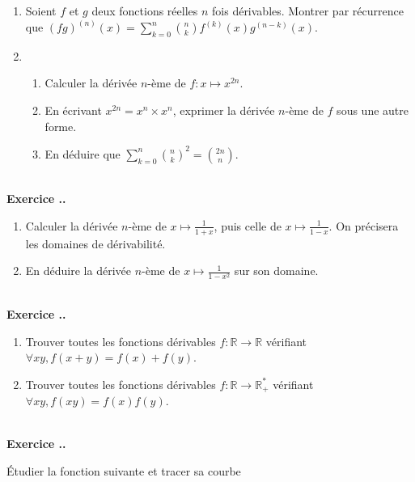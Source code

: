 \documentclass{article}
\newcommand{\mb}[1]{\mathbb{#1}}
\newcounter{exo}
\newcommand{\exercice}[1][\null]{\textbf{\\ Exercice \thesection.\theexo. #1} \addtocounter{exo}{1}}
\begin{document}
\begin{enumerate}

\item Soient $f$ et $g$ deux fonctions réelles $n$ fois dérivables. Montrer par récurrence que $\displaystyle (fg)^{(n)} (x)= \sum_{k=0}^n {n \choose k} f^{(k)}(x) g^{(n-k)}(x)$.

\item \begin{enumerate}

\item Calculer la dérivée $n$-ème de $f:x \mapsto x^{2n}$.

\item En écrivant $x^{2n} = x^n\times x^n$, exprimer la dérivée $n$-ème de $f$ sous une autre forme.

\item En déduire que $\displaystyle \sum_{k=0}^n {n \choose k}^2 = {2n \choose n}$.

\end{enumerate}

\end{enumerate}

\exercice 

\begin{enumerate}

\item Calculer la dérivée $n$-ème de $x \mapsto \frac{1}{1+x}$, puis celle de $x \mapsto \frac{1}{1-x}$. On précisera les domaines de dérivabilité.

\item En déduire la dérivée $n$-ème de $x \mapsto \frac{1}{1-x^2}$ sur son domaine.

\end{enumerate}





\exercice

\begin{enumerate}

\item Trouver toutes les fonctions dérivables $f :\mb{R} \rightarrow \mb{R}$ vérifiant $\forall xy, f(x+y) = f(x)+ f(y)$.

\item Trouver toutes les fonctions dérivables $f :\mb{R} \rightarrow \mb{R}^*_+$ vérifiant $\forall xy, f(xy) = f(x)f(y)$.
\end{enumerate}


\exercice

Étudier la fonction suivante et tracer sa courbe 
\end{document}
